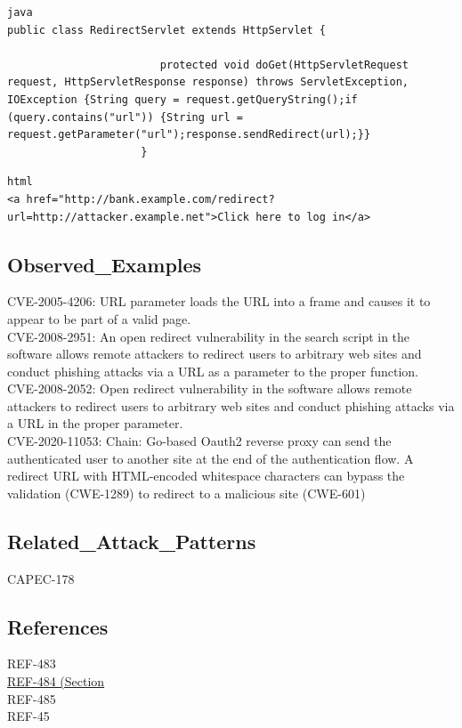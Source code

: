 \begin{lstlisting}[breaklines=true,postbreak=\mbox{$\hookrightarrow$\space}]
java
public class RedirectServlet extends HttpServlet {
                     
                        protected void doGet(HttpServletRequest request, HttpServletResponse response) throws ServletException, IOException {String query = request.getQueryString();if (query.contains("url")) {String url = request.getParameter("url");response.sendRedirect(url);}}
                     }
\end{lstlisting}

\begin{lstlisting}[breaklines=true,postbreak=\mbox{$\hookrightarrow$\space}]
html
<a href="http://bank.example.com/redirect?url=http://attacker.example.net">Click here to log in</a>
\end{lstlisting}

\subsection*{Observed\_Examples}
CVE-2005-4206: URL parameter loads the URL into a frame and causes it to appear to be part of a valid page.\\
CVE-2008-2951: An open redirect vulnerability in the search script in the software allows remote attackers to redirect users to arbitrary web sites and conduct phishing attacks via a URL as a parameter to the proper function.\\
CVE-2008-2052: Open redirect vulnerability in the software allows remote attackers to redirect users to arbitrary web sites and conduct phishing attacks via a URL in the proper parameter.\\
CVE-2020-11053: Chain: Go-based Oauth2 reverse proxy can send the authenticated user to another site at the end of the authentication flow. A redirect URL with HTML-encoded whitespace characters can bypass the validation (CWE-1289) to redirect to a malicious site (CWE-601)\\
\subsection*{Related\_Attack\_Patterns}
CAPEC-178\\
\subsection*{References}
REF-483\\
\href{Page 43)}{REF-484 (Section}\\
REF-485\\
REF-45\\
